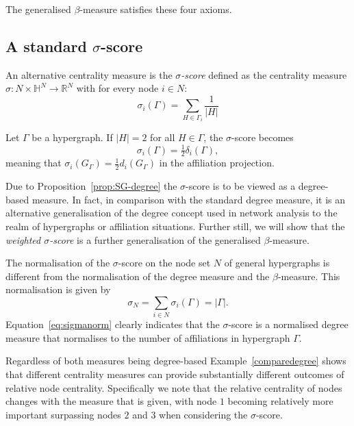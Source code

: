 The generalised $\beta$-measure satisfies these four axioms.

\subsection{A standard $\sigma$-score}

An alternative centrality measure is the \emph{$\sigma$-score} defined as the centrality measure $\sigma \colon N \times \mathbb{H}^N \to \mathbb{R}^N$ with for every node $i \in N \colon$
\begin{equation}
\sigma_i (\Gamma ) = \sum_{H \in \Gamma_i} \frac{1}{|H|}
\end{equation}
\begin{proposition} \label{prop:SG-degree}
Let $\Gamma$ be a hypergraph. If $| H | = 2$ for all $H \in \Gamma$, the $\sigma$-score becomes
\begin{equation}
\sigma_i (\Gamma ) = \tfrac{1}{2} \delta_i ( \Gamma ) ,
\end{equation}
meaning that $\sigma_{i}(G_{\Gamma}) = \tfrac{1}{2} d_{i} (G_{\Gamma})$ in the affiliation projection.
\end{proposition}
Due to Proposition~\ref{prop:SG-degree} the $\sigma$-score is to be viewed as a degree-based measure. In fact, in comparison with the standard degree measure, it is an alternative generalisation of the degree concept used in network analysis to the realm of hypergraphs or affiliation situations. Further still, we will show that the \emph{weighted $\sigma$-score} is a further generalisation of the generalised $\beta$-measure.

The normalisation of the $\sigma$-score on the node set $N$ of general hypergraphs is different from the normalisation of the degree measure and the $\beta$-measure. This normalisation is given by
\begin{equation} \label{eq:sigmanorm}
\sigma_{N} = \sum_{i \in N} \sigma_i (\Gamma ) = | \Gamma | .
\end{equation}
Equation~\ref{eq:sigmanorm} clearly indicates that the $\sigma$-score is a normalised degree measure that normalises to the number of affiliations in hypergraph $\Gamma$.

Regardless of both measures being degree-based Example~\ref{comparedegree} shows that different centrality measures can provide substantially different outcomes of relative node centrality. Specifically we note that the relative centrality of nodes changes with the measure that is given, with node $1$ becoming relatively more important surpassing nodes $2$ and $3$ when considering the $\sigma$-score.

